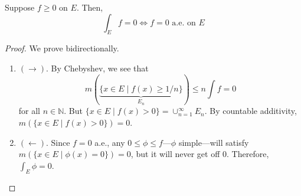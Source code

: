  \begin{theorem}
    Suppose $f \geq 0$ on $E$. Then, 
    \begin{equation}
      \int_E f = 0 \iff f = 0 \text{ a.e. on } E
    \end{equation}
  \end{theorem}
  \begin{proof}
    We prove bidirectionally. 
    \begin{enumerate}
      \item $(\rightarrow)$. By Chebyshev, we see that 
        \begin{equation}
          m(\underbrace{\{ x \in E \mid f(x) \geq 1/n \}}_{E_n}) \leq n \int f = 0 
        \end{equation}
        for all $n \in \mathbb{N}$. But $\{x \in E \mid f(x) > 0\} = \cup_{n=1}^\infty E_n$. By countable additivity, $m(\{x \in E \mid f(x) > 0\}) = 0$. 

      \item $(\leftarrow)$. Since $f = 0$ a.e., any $0 \leq \phi \leq f$---$\phi$ simple---will satisfy $m(\{x \in E \mid \phi(x) = 0 \}) = 0$, but it will never get off $0$. Therefore, $\int_E \phi = 0$. 
    \end{enumerate}
  \end{proof}

